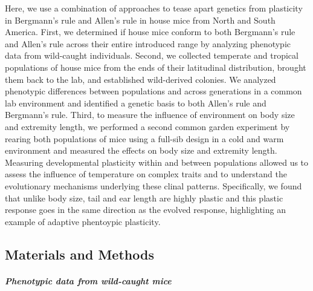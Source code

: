 \documentclass[]{article}
\let\oldsubparagraph\subparagraph
\renewcommand{\subparagraph}[1]{\oldsubparagraph{#1}\mbox{}}
\begin{document}
Here, we use a combination of approaches to tease apart genetics from
plasticity in Bergmann's rule and Allen's rule in house mice from North
and South America. First, we determined if house mice conform to both
Bergmann's rule and Allen's rule across their entire introduced range by
analyzing phenotypic data from wild-caught individuals. Second, we
collected temperate and tropical populations of house mice from the ends
of their latitudinal distribution, brought them back to the lab, and
established wild-derived colonies. We analyzed phenotypic differences
between populations and across generations in a common lab environment
and identified a genetic basis to both Allen's rule and Bergmann's rule.
Third, to measure the influence of environment on body size and
extremity length, we performed a second common garden experiment by
rearing both populations of mice using a full-sib design in a cold and
warm environment and measured the effects on body size and extremity
length. Measuring developmental plasticity within and between
populations allowed us to assess the influence of temperature on complex
traits and to understand the evolutionary mechanisms underlying these
clinal patterns. Specifically, we found that unlike body size, tail and
ear length are highly plastic and this plastic response goes in the same
direction as the evolved response, highlighting an example of adaptive
phentoypic plasticity.

\vspace{5mm}

\hypertarget{materials-and-methods}{%
\subsection{Materials and Methods}\label{materials-and-methods}}

\hypertarget{phenotypic-data-from-wild-caught-mice}{%
\subparagraph{\texorpdfstring{\emph{Phenotypic data from wild-caught
mice}}{Phenotypic data from wild-caught mice}}\label{phenotypic-data-from-wild-caught-mice}}
\end{document}
